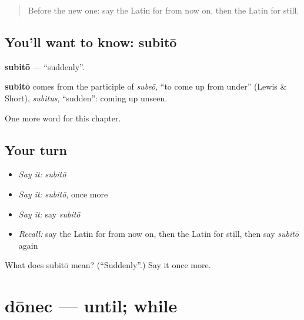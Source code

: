 \label{lesson:LA-C175-subito}



\begin{quote}
Before the new one: say the Latin for from now on, then the Latin for still.
\end{quote}

\subsection*{You'll want to know: subitō}
\textbf{subitō} — \textquotedblleft{}suddenly\textquotedblright{}.

\begin{cousinweb}
\textbf{subitō} comes from the participle of \emph{subeō}, \textquotedblleft{}to come up from under\textquotedblright{} (Lewis \& Short), \emph{subitus}, \textquotedblleft{}sudden\textquotedblright{}: coming up unseen.
\end{cousinweb}

\begin{grammarlens}[title={What you've built}]
One more word for this chapter.
\end{grammarlens}

\subsection*{Your turn}
\begin{itemize}
\raggedright
  \item \emph{Say it:} \emph{subitō}
  \item \emph{Say it:} \emph{subitō}, once more
  \item \emph{Say it:} say \emph{subitō}
  \item \emph{Recall:} say the Latin for from now on, then the Latin for still, then say \emph{subitō} again
\end{itemize}

\begin{tcolorbox}[breakable,colback=teal!4,colframe=teal!35!black,title={Before you move on}]
What does subitō mean? (\textquotedblleft{}Suddenly\textquotedblright{}.) Say it once more.
\end{tcolorbox}
\section[dōnec]{dōnec — until; while}

\label{lesson:LA-C175-donec}



